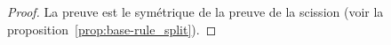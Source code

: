 \begin{proof}

	La preuve est le symétrique de la preuve de la scission (voir la proposition~\ref{prop:base-rule_split}).
\end{proof}




